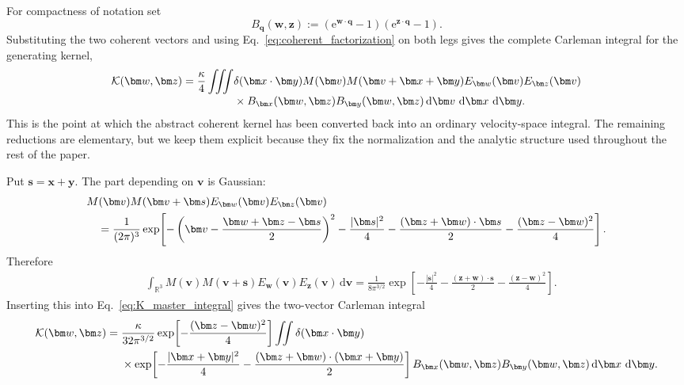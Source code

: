 \documentclass[11pt]{article}
\numberwithin{equation}{section}
\newcommand{\R}{\mathbb R}
\newcommand{\dd}{\,\mathrm d}
\newcommand{\e}{\mathrm e}
\theoremstyle{definition}
\begin{document}
For compactness of notation set
\begin{equation}
 B_{\bm q}(\bm w,\bm z)
 :=
 \left(\e^{\bm w\cdot\bm q}-1\right)
 \left(\e^{\bm z\cdot\bm q}-1\right).
 \label{eq:Bq_def}
\end{equation}
Substituting the two coherent vectors and using
Eq.~\eqref{eq:coherent_factorization} on both legs gives the complete
Carleman integral for the generating kernel,
\begin{align}
 \mathcal K(\bm w,\bm z)
 =\frac{\kappa}{4}
 \iiint &\delta(\bm x\cdot\bm y)
 M(\bm v)M(\bm v+\bm x+\bm y)
 E_{\bm w}(\bm v)E_{\bm z}(\bm v)
 \notag\\[-1mm]
 &\times
 B_{\bm x}(\bm w,\bm z)
 B_{\bm y}(\bm w,\bm z)
 \dd\bm v\,\dd\bm x\,\dd\bm y.
 \label{eq:K_master_integral}
\end{align}
This is the point at which the abstract coherent kernel has been converted
back into an ordinary velocity-space integral.  The remaining reductions are
elementary, but we keep them explicit because they fix the normalization and
the analytic structure used throughout the rest of the paper.

Put $\bm s=\bm x+\bm y$.  The part depending on $\bm v$ is Gaussian:
\begin{align}
 &M(\bm v)M(\bm v+\bm s)
 E_{\bm w}(\bm v)E_{\bm z}(\bm v)
 \notag\\
 &\quad=
 \frac{1}{(2\pi)^3}
 \exp\!\left[
 -\left(
 \bm v-\frac{\bm w+\bm z-\bm s}{2}
 \right)^2
 -\frac{|\bm s|^2}{4}
 -\frac{(\bm z+\bm w)\cdot\bm s}{2}
 -\frac{(\bm z-\bm w)^2}{4}
 \right].
 \label{eq:v_gaussian_completed_square}
\end{align}
Therefore
\begin{align}
&\int_{\R^3}
 M(\bm v)M(\bm v+\bm s)
 E_{\bm w}(\bm v)E_{\bm z}(\bm v)\dd\bm v
=
\frac{1}{8\pi^{3/2}}
\exp\!\left[
-\frac{|\bm s|^2}{4}
-\frac{(\bm z+\bm w)\cdot\bm s}{2}
-\frac{(\bm z-\bm w)^2}{4}
\right].
\label{eq:v_gaussian_main}
\end{align}
Inserting this into Eq.~\eqref{eq:K_master_integral} gives the two-vector
Carleman integral
\begin{align}
 \mathcal K(\bm w,\bm z)
 ={}&
 \frac{\kappa}{32\pi^{3/2}}
 \exp\!\left[-\frac{(\bm z-\bm w)^2}{4}\right]
 \iint
 \delta(\bm x\cdot\bm y)
 \notag\\
 &\times
 \exp\!\left[
 -\frac{|\bm x+\bm y|^2}{4}
 -\frac{(\bm z+\bm w)\cdot(\bm x+\bm y)}{2}
 \right]
 B_{\bm x}(\bm w,\bm z)
 B_{\bm y}(\bm w,\bm z)
 \dd\bm x\,\dd\bm y.
 \label{eq:K_after_v}
\end{align}
\end{document}
